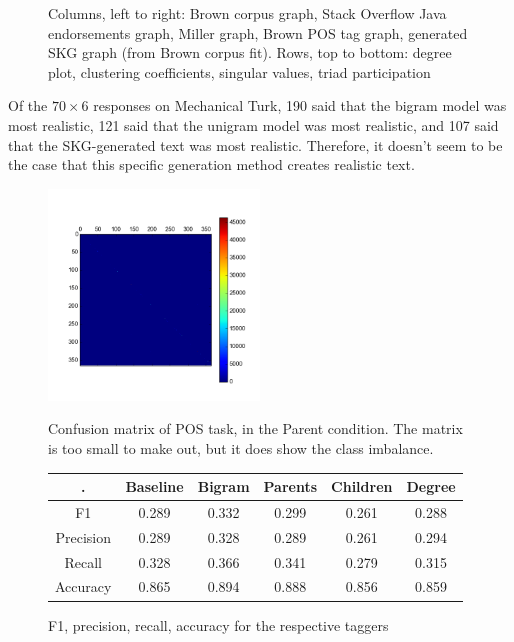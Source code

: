 \documentclass[12pt]{article}
\begin{document}
\begin{figure}
  \caption{Columns, left to right: Brown corpus graph, Stack Overflow Java endorsements graph, Miller graph, Brown POS tag graph, generated SKG graph (from Brown corpus fit). Rows, top to bottom: degree plot, clustering coefficients, singular values, triad participation}
\end{figure}

Of the $70 \times 6$ responses on Mechanical Turk, 190 said that the bigram model was most realistic, 121 said that the unigram model was most realistic, and 107 said that the SKG-generated text was most realistic. Therefore, it doesn't seem to be the case that this specific generation method creates realistic text.

\begin{figure}
  \includegraphics[width=0.50\textwidth]{kron_conf_mat}
  \label{fig:confmat}
  \caption{Confusion matrix of POS task, in the Parent condition. The matrix is too small to make out, but it does show the class imbalance.}
\end{figure}

\begin{figure}
  \begin{tabular}{c || c | c | c | c | c}
    \hline
    . & Baseline & Bigram & Parents & Children & Degree \\
    \hline
    F1 & 0.289 & 0.332 & 0.299 & 0.261 & 0.288 \\
    Precision & 0.289 & 0.328 & 0.289 & 0.261 & 0.294 \\
    Recall & 0.328 & 0.366 & 0.341 & 0.279 & 0.315 \\
    Accuracy & 0.865 & 0.894 & 0.888 & 0.856 & 0.859 \\
    \hline
  \end{tabular}
  \caption{F1, precision, recall, accuracy for the respective taggers}
  \label{fig:f1s}
\end{figure}
\end{document}
